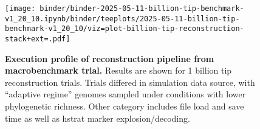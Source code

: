 \begin{figure}[h]
\centering
\texttt{[image: binder/binder-2025-05-11-billion-tip-benchmark-v1\_20\_10.ipynb/binder/teeplots/2025-05-11-billion-tip-benchmark-v1\_20\_10/viz=plot-billion-tip-reconstruction-stack+ext=.pdf]}
\vspace{-1em}
\caption{%
\textbf{Execution profile of reconstruction pipeline from macrobenchmark trial.}
\small
Results are shown for 1 billion tip reconstruction trials.
Trials differed in simulation data source, with ``adaptive regime'' genomes sampled under conditions with lower phylogenetic richness.
Other category includes file load and save time as well as hstrat marker explosion/decoding.
}
\label{fig:billion-tip-time}
\vspace{-1.5em}
\end{figure}
